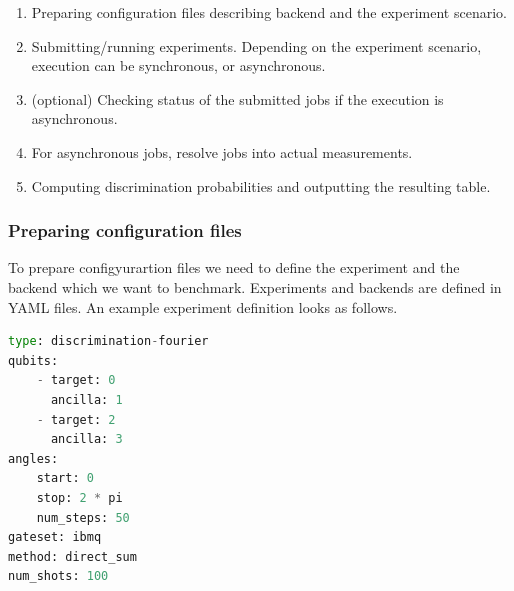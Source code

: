 \documentclass[preprint,12pt, a4paper, dvipsnames]{elsarticle}
\newcommand{\1}{{\rm 1\hspace{-0.9mm}l}}
\begin{document}
\begin{enumerate}

\item Preparing configuration files describing backend and the experiment scenario.
\item Submitting/running experiments. Depending on the experiment scenario, execution can be synchronous, or asynchronous.
\item (optional) Checking status of the submitted jobs if the execution is asynchronous.
\item For asynchronous jobs, 
resolve jobs into actual measurements.
\item Computing discrimination probabilities and outputting the resulting table.
\end{enumerate} 
\subsubsection{Preparing configuration files}
To prepare configyurartion files we need to define the experiment and the   backend 
which we want to benchmark. Experiments and backends are defined in YAML files. An example experiment definition looks as follows.


\begin{lstlisting}[language=Python, caption=Defining the experiment]
type: discrimination-fourier
qubits:
	- target: 0
	  ancilla: 1
	- target: 2
      ancilla: 3
angles:
	start: 0
	stop: 2 * pi
	num_steps: 50
gateset: ibmq
method: direct_sum
num_shots: 100
\end{lstlisting}
\end{document}
